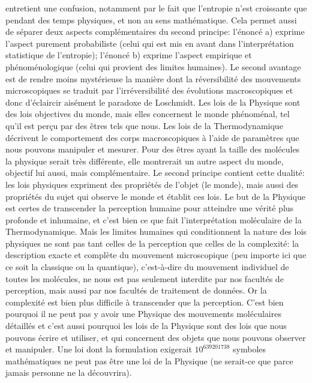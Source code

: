 entretient une confusion, notamment par le fait que l'entropie n'est 
croissante que pendant des temps physiques, et non au sens math\'ematique. 
Cela permet aussi de s\'eparer deux aspects compl\'ementaires du second 
principe: l'\'enonc\'e a) exprime l'aspect purement probabiliste (celui 
qui est mis en avant dans l'interpr\'etation statistique de l'entropie);
l'\'enonc\'e b) exprime l'aspect empirique et ph\'enom\'enologique (celui 
qui provient des limites humaines).
Le second avantage est de rendre moins myst\'erieuse la mani\`ere dont
la r\'eversibilit\'e des mouvements microscopiques 
se traduit par l'irr\'eversibilit\'e des \'evolutions macroscopiques et 
donc d'\'eclaircir ais\'ement le paradoxe de Loschmidt. 
\medskip
Les lois de la Physique sont des lois objectives du monde, mais elles 
concernent le monde ph\'enom\'enal, tel qu'il est per\c{c}u par des \^etres 
tels que nous. Les lois de la Thermodynamique d\'ecrivent le comportement 
des corps macroscopiques \`a l'aide de param\`etres que nous pouvons 
manipuler et mesurer. Pour des \^etres ayant la taille des mol\'ecules 
la physique serait tr\`es diff\'erente, elle montrerait un autre aspect 
du monde, objectif lui aussi, mais compl\'ementaire. Le second principe 
contient cette dualit\'e: les lois physiques expriment des propri\'et\'es 
de l'objet (le monde), mais aussi des propri\'et\'es du sujet qui observe 
le monde et \'etablit ces lois. Le but de la 
Physique est certes de transcender la perception humaine pour atteindre 
une v\'erit\'e plus profonde et inhumaine, et c'est bien ce que fait 
l'interpr\'etation mol\'eculaire de la Thermodynamique. Mais les limites 
humaines qui conditionnent la nature des lois physiques ne sont pas tant 
celles de la perception que celles de la complexit\'e: la 
description exacte et compl\`ete du mouvement microscopique (peu 
importe ici que ce soit la classique ou la quantique), c'est-\`a-dire 
du mouvement individuel de toutes les mol\'ecules, ne nous est pas 
seulement interdite par nos facult\'es de perception, mais aussi par nos 
facult\'es de traitement de donn\'ees. Or la complexit\'e est bien plus 
difficile \`a transcender que la perception. C'est bien pourquoi il ne 
peut pas y avoir une Physique des mouvements mol\'eculaires d\'etaill\'es 
et c'est aussi pourquoi les lois de la Physique sont des lois que nous 
pouvons \'ecrire et utiliser, et qui concernent des objets que nous 
pouvons observer et manipuler. Une loi dont la formulation exigerait 
$10^{639201738}$ symboles math\'ematiques ne peut pas \^etre une loi de 
la Physique (ne serait-ce que parce jamais personne ne la d\'ecouvrira).
